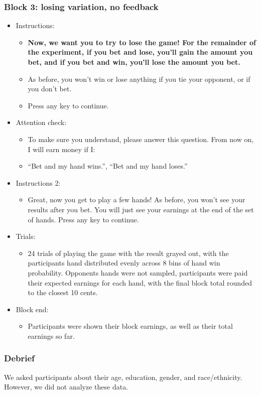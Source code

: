 \subsubsection{Block 3: losing variation, no feedback}
\begin{itemize}
\item Instructions:
    \begin{itemize}
    \item \textbf{\color{red} Now, we want you to try to lose the game! For the remainder of the experiment, if you bet and lose, you'll gain the amount you bet, and if you bet and win, you'll lose the amount you bet.}
    \item As before, you won't win or lose anything if you tie your opponent, or if you don't bet.
    \item Press any key to continue.
    \end{itemize}
\item Attention check:
    \begin{itemize}
    \item To make sure you understand, please answer this question. From now on, I will earn money if I:
    \item ``Bet and my hand wins.'', ``Bet and my hand loses.'' 
    \end{itemize}
\item Instructions 2:
    \begin{itemize}
    \item Great, now you get to play a few hands! As before, you won't see your results after you bet. You will just see your earnings at the end of the set of hands. Press any key to continue.
    \end{itemize}
\item Trials:
    \begin{itemize}
    \item 24 trials of playing the game with the result grayed out, with the participants hand distributed evenly across 8 bins of hand win probability. Opponents hands were not sampled, participants were paid their expected earnings for each hand, with the final block total rounded to the closest 10 cents. 
    \end{itemize}
\item Block end:
    \begin{itemize}
    \item Participants were shown their block earnings, as well as their total earnings so far.
    \end{itemize}
\end{itemize}

\subsubsection{Debrief}
We asked participants about their age, education, gender, and race/ethnicity. However, we did not analyze these data.
